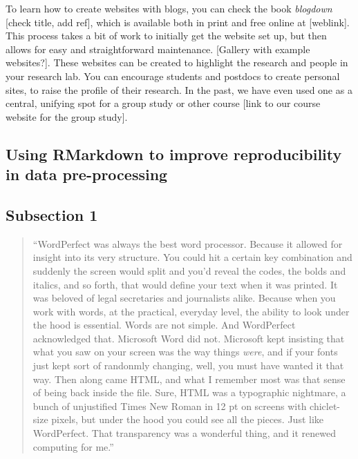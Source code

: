 \documentclass[]{tufte-book}
\begin{document}
To learn how to create websites with blogs, you can check the book \emph{blogdown} {[}check
title, add ref{]}, which is available both in print and free online at {[}weblink{]}. This
process takes a bit of work to initially get the website set up, but then allows for
easy and straightforward maintenance. {[}Gallery with example websites?{]}. These
websites can be created to highlight the research and people in your research lab.
You can encourage students and postdocs to create personal sites, to raise the profile
of their research. In the past, we have even used one as a central, unifying spot
for a group study or other course {[}link to our course website for the group study{]}.

\hypertarget{using-rmarkdown-to-improve-reproducibility-in-data-pre-processing}{%
\subsection{Using RMarkdown to improve reproducibility in data pre-processing}\label{using-rmarkdown-to-improve-reproducibility-in-data-pre-processing}}

\hypertarget{subsection-1-10}{%
\subsection{Subsection 1}\label{subsection-1-10}}

\begin{quote}
``WordPerfect was always the best word processor. Because it allowed for insight into
its very structure. You could hit a certain key combination and suddenly the screen
would split and you'd reveal the codes, the bolds and italics, and so forth,
that would define your text when it was printed. It was beloved of legal secretaries
and journalists alike. Because when you work with words, at the practical, everyday
level, the ability to look under the hood is essential. Words are not simple. And
WordPerfect acknowledged that. Microsoft Word did not. Microsoft kept insisting that
what you saw on your screen was the way things \emph{were}, and if your fonts just kept
sort of randonmly changing, well, you must have wanted it that way. Then along came
HTML, and what I remember most was that sense of being back inside the file. Sure,
HTML was a typographic nightmare, a bunch of unjustified Times New Roman in 12 pt on
screens with chiclet-size pixels, but under the hood you could see all the pieces.
Just like WordPerfect. That transparency was a wonderful thing, and it renewed
computing for me.'' \citep{ford2015on}
\end{quote}
\end{document}
